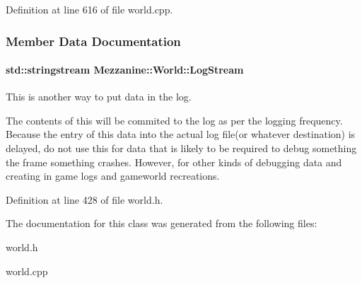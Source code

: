 Definition at line 616 of file world.cpp.



\subsubsection{Member Data Documentation}
\hypertarget{classMezzanine_1_1World_a32b1c4de1bbf5495452e463802ffa499}{
\paragraph[{LogStream}]{\setlength{\rightskip}{0pt plus 5cm}std::stringstream {\bf Mezzanine::World::LogStream}}\hfill}
\label{classMezzanine_1_1World_a32b1c4de1bbf5495452e463802ffa499}


This is another way to put data in the log. 

The contents of this will be commited to the log as per the logging frequency. Because the entry of this data into the actual log file(or whatever destination) is delayed, do not use this for data that is likely to be required to debug something the frame something crashes. However, for other kinds of debugging data and creating in game logs and gameworld recreations. 

Definition at line 428 of file world.h.



The documentation for this class was generated from the following files:\begin{DoxyCompactItemize}
\item 
world.h\item 
world.cpp\end{DoxyCompactItemize}
